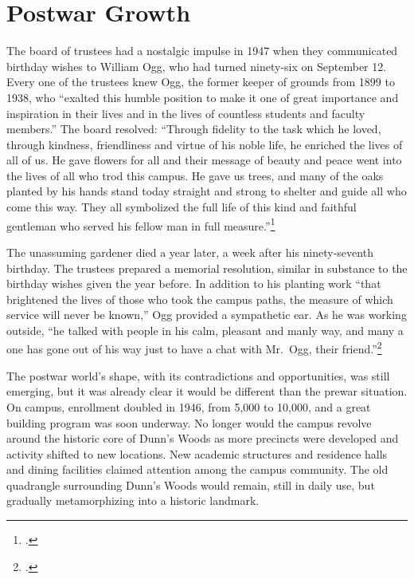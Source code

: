 \documentclass[
  american,
  letterpaper,
]{scrreprt}
\begin{document}
\section{Postwar Growth}\label{postwar-growth}

The board of trustees had a nostalgic impulse in 1947 when they
communicated birthday wishes to William Ogg, who had turned ninety-six
on September 12. Every one of the trustees knew Ogg, the former keeper
of grounds from 1899 to 1938, who ``exalted this humble position to make
it one of great importance and inspiration in their lives and in the
lives of countless students and faculty members.'' The board resolved:
``Through fidelity to the task which he loved, through kindness,
friendliness and virtue of his noble life, he enriched the lives of all
of us. He gave flowers for all and their message of beauty and peace
went into the lives of all who trod this campus. He gave us trees, and
many of the oaks planted by his hands stand today straight and strong to
shelter and guide all who come this way. They all symbolized the full
life of this kind and faithful gentleman who served his fellow man in
full measure.''\footnote{.}

The unassuming gardener died a year later, a week after his
ninety-seventh birthday. The trustees prepared a memorial resolution,
similar in substance to the birthday wishes given the year before. In
addition to his planting work ``that brightened the lives of those who
took the campus paths, the measure of which service will never be
known,'' Ogg provided a sympathetic ear. As he was working outside, ``he
talked with people in his calm, pleasant and manly way, and many a one
has gone out of his way just to have a chat with Mr.~Ogg, their
friend.''\footnote{.}

The postwar world's shape, with its contradictions and opportunities,
was still emerging, but it was already clear it would be different than
the prewar situation. On campus, enrollment doubled in 1946, from 5,000
to 10,000, and a great building program was soon underway. No longer
would the campus revolve around the historic core of Dunn's Woods as
more precincts were developed and activity shifted to new locations. New
academic structures and residence halls and dining facilities claimed
attention among the campus community. The old quadrangle surrounding
Dunn's Woods would remain, still in daily use, but gradually
metamorphizing into a historic landmark.
\end{document}
